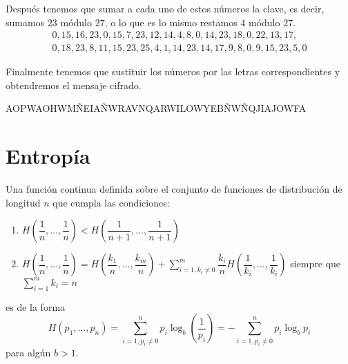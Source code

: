 Después tenemos que sumar a cada uno de estos números la clave, es decir, sumamos $23$ módulo $27$, o lo que es lo mismo restamos $4$ módulo $27$.
\begin{gather*}
    0, 15, 16, 23, 0, 15, 7, 23, 12, 14, 4, 8, 0, 14, 23, 18, 0, 22, 13, 17, \\ 0, 18, 23, 8, 11, 15, 23, 25, 4, 1, 14, 23, 14, 17, 9, 8, 0, 9, 15, 23, 5, 0
\end{gather*}

Finalmente tenemos que sustituir los números por las letras correspondientes y obtendremos el mensaje cifrado.

\begin{center}
    AOPWAOHWMÑEIAÑWRAVNQARWILOWYEBÑWÑQJIAJOWFA
\end{center}
\section{Entropía}

\begin{teo}
    Una función continua definida sobre el conjunto de funciones de distribución de longitud $n$ que cumpla las condiciones:

    \begin{enumerate}[label=(\arabic*)]
        \item\label{item:l1-i1} $H\left(\dfrac{1}{n},\dots,\dfrac{1}{n}\right) < H\left(\dfrac{1}{n+1},\dots,\dfrac{1}{n+1}\right)$
        \item\label{item:l1-i2} $\displaystyle H\left(\dfrac{1}{n},\dots,\dfrac{1}{n}\right) = H\left(\dfrac{k_1}{n},\dots,\dfrac{k_m}{n}\right)+\sum_{i=1, k_i\neq 0}^m\dfrac{k_i}{n}H\left(\dfrac{1}{k_i},\dots,\dfrac{1}{k_i}\right)$ siempre que $\displaystyle \sum_{i=1}^mk_i=n$
    \end{enumerate}
    es de la forma
    $$H(p_1,\dots,p_n)=\sum_{i=1, p_i\ne 0}^np_i\log_b\left(\dfrac{1}{p_i}\right)=-\sum_{i=1, p_i\ne 0}^np_i\log_bp_i$$
    para algún $b>1$. 
\end{teo}

